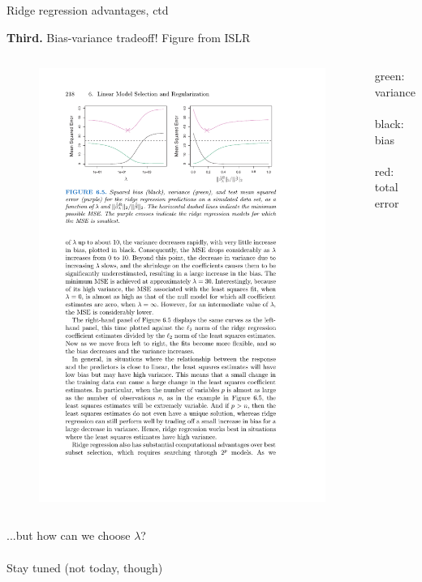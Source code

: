 \documentclass[mathserif, aspectratio=169]{beamer}
\begin{document}
\begin{frame}{Ridge regression advantages, ctd}

\textbf{Third.}  Bias-variance tradeoff! {\tiny Figure from ISLR}

\begin{columns}
\begin{figure}
\includegraphics[scale=1.1]{bias-variance-ridge}
\end{figure}


green: variance\\~\\
black: bias\\~\\
red: total error

\end{columns}

...but how can we choose $\lambda$?\\~\\

Stay tuned (not today, though)
\end{frame}
\end{document}
